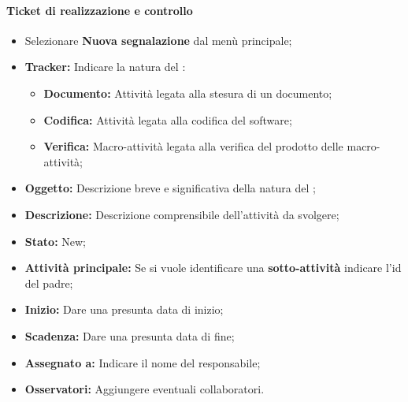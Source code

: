             \paragraph{Ticket di realizzazione e controllo}
              \begin{itemize}
                \item Selezionare \textbf{Nuova segnalazione} dal menù principale;
                \item \textbf{Tracker: }Indicare la natura del :
                \bgroup
                  \begin{itemize}
                    \item \textbf{Documento: }Attività legata alla stesura di un documento;
                    \item \textbf{Codifica: }Attività legata alla  codifica del software;
                    \item \textbf{Verifica: }Macro-attività legata alla verifica del prodotto delle macro-attività;
                  \end{itemize}
                \egroup
                  \item \textbf{Oggetto: }Descrizione breve e significativa della natura del ;
                \item \textbf{Descrizione: }Descrizione comprensibile dell'attività da svolgere;
                \item \textbf{Stato: }New;
                \item \textbf{Attività principale: }Se si vuole identificare una \textbf{sotto-attività} indicare l'id del  padre;
                \item \textbf{Inizio: }Dare una presunta data di inizio;
                \item \textbf{Scadenza: }Dare una presunta data di fine;
                \item \textbf{Assegnato a: }Indicare il nome del responsabile;
                \item \textbf{Osservatori: }Aggiungere eventuali collaboratori.
              \end{itemize}
